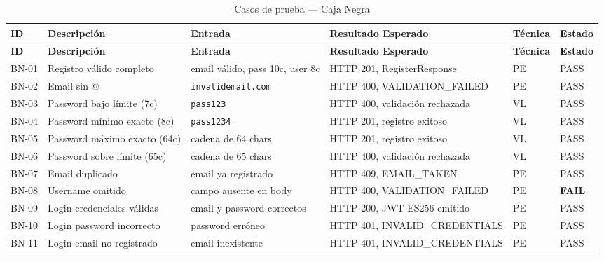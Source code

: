 \documentclass[11pt,a4paper]{article}
\begin{document}
\renewcommand{\arraystretch}{1.3}
\begin{longtable}{|p{0.9cm}|p{3.2cm}|p{3cm}|p{3.8cm}|p{1.3cm}|p{1.1cm}|}
\caption{Casos de prueba — Caja Negra}\label{tab:bn}\\
\hline
\rowcolor{headerblue}
\color{white}\textbf{ID} & \color{white}\textbf{Descripción} & \color{white}\textbf{Entrada} & \color{white}\textbf{Resultado Esperado} & \color{white}\textbf{Técnica} & \color{white}\textbf{Estado} \\
\hline
\endfirsthead
\hline
\rowcolor{headerblue}
\color{white}\textbf{ID} & \color{white}\textbf{Descripción} & \color{white}\textbf{Entrada} & \color{white}\textbf{Resultado Esperado} & \color{white}\textbf{Técnica} & \color{white}\textbf{Estado} \\
\hline
\endhead

BN-01 & Registro válido completo & email válido, pass 10c, user 8c & HTTP 201, RegisterResponse & PE & PASS \\
\hline
\rowcolor{rowgray}
BN-02 & Email sin @ & \texttt{invalidemail.com} & HTTP 400, VALIDATION\_FAILED & PE & PASS \\
\hline
BN-03 & Password bajo límite (7c) & \texttt{pass123} & HTTP 400, validación rechazada & VL & PASS \\
\hline
\rowcolor{rowgray}
BN-04 & Password mínimo exacto (8c) & \texttt{pass1234} & HTTP 201, registro exitoso & VL & PASS \\
\hline
BN-05 & Password máximo exacto (64c) & cadena de 64 chars & HTTP 201, registro exitoso & VL & PASS \\
\hline
\rowcolor{rowgray}
BN-06 & Password sobre límite (65c) & cadena de 65 chars & HTTP 400, validación rechazada & VL & PASS \\
\hline
BN-07 & Email duplicado & email ya registrado & HTTP 409, EMAIL\_TAKEN & PE & PASS \\
\hline
\rowcolor{rowgray}
BN-08 & Username omitido & campo ausente en body & HTTP 400, VALIDATION\_FAILED & PE & \textbf{FAIL} \\
\hline
BN-09 & Login credenciales válidas & email y password correctos & HTTP 200, JWT ES256 emitido & PE & PASS \\
\hline
\rowcolor{rowgray}
BN-10 & Login password incorrecto & password erróneo & HTTP 401, INVALID\_CREDENTIALS & PE & PASS \\
\hline
BN-11 & Login email no registrado & email inexistente & HTTP 401, INVALID\_CREDENTIALS & PE & PASS \\
\hline
\rowcolor{rowgray}

\end{longtable}
\end{document}
